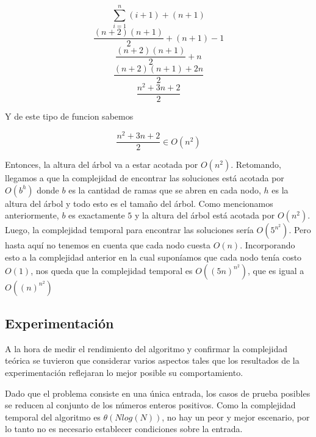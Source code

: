       \[
      \sum_{i=1}^{n}(i+1) + (n+1)
      \]
      \[
      \frac{(n+2)(n+1)}{2} + (n+1) - 1
      \]
      \[
      \frac{(n+2)(n+1)}{2} + n
      \]
      \[
      \frac{(n+2)(n+1)+2n}{2}
      \]
      \[
      \frac{n^2+3n+2}{2}
      \]

      Y de este tipo de funcion sabemos \newline

      \[
      \frac{n^2+3n+2}{2} \in O(n^2)
      \]

      Entonces, la altura del árbol va a estar acotada por $O(n^2)$.
      Retomando, llegamos a que la complejidad de encontrar las soluciones está acotada por $O(b^h)$ donde $b$ es la cantidad de ramas que se abren en cada nodo, $h$ es la altura del árbol y todo esto es el tamaño del árbol. Como mencionamos anteriormente, $b$ es exactamente $5$ y la altura del árbol está acotada por $O(n^2)$. Luego, la complejidad temporal para encontrar las soluciones sería $O(5^{n^2})$. Pero hasta aquí no tenemos en cuenta que cada nodo cuesta $O(n)$. Incorporando esto a la complejidad anterior en la cual suponíamos que cada nodo tenía costo $O(1)$, nos queda que la complejidad temporal es $O((5n)^{n^2})$, que es igual a $O((n)^{n^2})$



    \subsection{Experimentación}

	A la hora de medir el rendimiento del algoritmo y confirmar la complejidad
	teórica se tuvieron que considerar varios aspectos tales que los
	resultados de la experimentación reflejaran lo mejor posible su
	comportamiento.

	Dado que el problema consiste en una única entrada, los casos de prueba
	posibles se reducen al conjunto de los números enteros positivos. Como la
	complejidad temporal del algoritmo es $\theta(Nlog(N))$, no hay un peor
	y mejor escenario, por lo tanto no es necesario establecer condiciones sobre
	la entrada.

